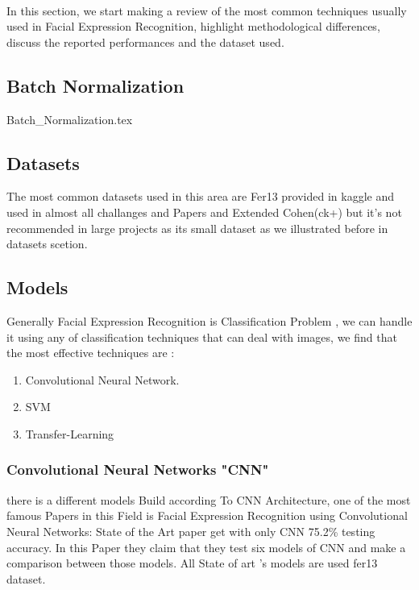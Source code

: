 \paragraph{}
In this section, we start making a review of the most common techniques usually used in Facial Expression Recognition, highlight methodological differences, discuss the reported performances and the dataset used. \newline
\subsection{Batch Normalization}
{Batch_Normalization.tex}
\subsection{Datasets}
The most common datasets used in this area are Fer13 \label{fer_13} provided in kaggle and used in almost all challanges and Papers and Extended Cohen(ck+)\label{ck+} but it's not recommended in large projects as its small dataset as we illustrated before in datasets scetion.

\subsection{Models}
Generally Facial Expression Recognition is Classification Problem , we can handle it using any of classification techniques that can deal with images, we find that the most effective techniques are :
\begin{enumerate}
	\item Convolutional Neural Network.
	\item SVM
	\item Transfer-Learning
\end{enumerate}
\subsubsection{Convolutional Neural Networks "CNN"}
there is a different models Build according To CNN Architecture, one of the most famous Papers in this Field is Facial Expression Recognition using Convolutional Neural Networks: State of the Art paper\cite{state_of_art} get with only CNN 75.2\% testing accuracy. In this Paper they claim that they test six models of CNN and make a comparison between those models. All State of art 's models are used fer13 dataset.
